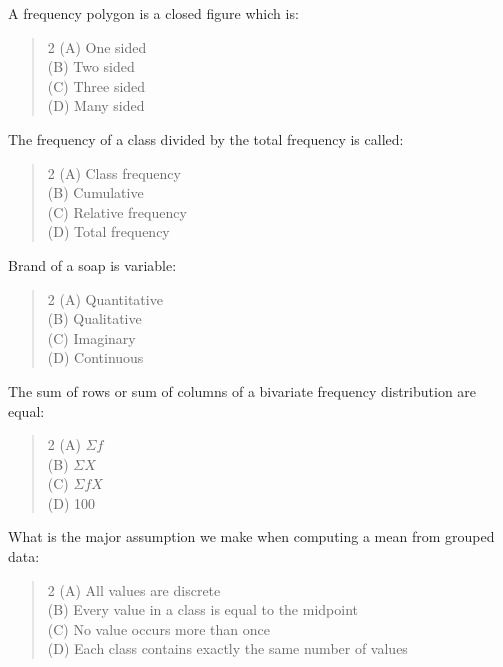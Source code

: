 \documentclass[11pt,a4paper]{article}
\begin{document}
\begin{mcqlist}
\item A frequency polygon is a closed figure which is:
\begin{quote}\begin{multicols}{2}
\noindent (A) One sided \\
(B) Two sided \\
(C) Three sided \\
(D) Many sided
\end{multicols}\end{quote}

\item The frequency of a class divided by the total frequency is called:
\begin{quote}\begin{multicols}{2}
\noindent (A) Class frequency \\
(B) Cumulative \\
(C) Relative frequency \\
(D) Total frequency
\end{multicols}\end{quote}

\item Brand of a soap is \underline{\hspace{1.2cm}} variable:
\begin{quote}\begin{multicols}{2}
\noindent (A) Quantitative \\
(B) Qualitative \\
(C) Imaginary \\
(D) Continuous
\end{multicols}\end{quote}

\item The sum of rows or sum of columns of a bivariate frequency distribution are equal:
\begin{quote}\begin{multicols}{2}
\noindent (A) $\Sigma f$ \\
(B) $\Sigma X$ \\
(C) $\Sigma fX$ \\
(D) 100
\end{multicols}\end{quote}

\item What is the major assumption we make when computing a mean from grouped data:
\begin{quote}\begin{multicols}{2}
\noindent (A) All values are discrete \\
(B) Every value in a class is equal to the midpoint \\
(C) No value occurs more than once \\
(D) Each class contains exactly the same number of values
\end{multicols}\end{quote}


\end{mcqlist}
\end{document}
